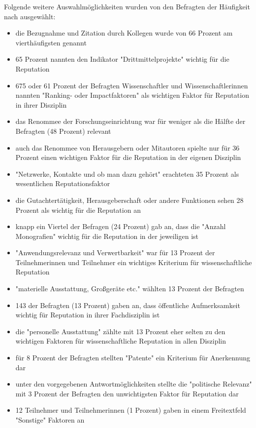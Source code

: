 Folgende weitere Auswahlmöglichkeiten wurden von den Befragten der Häufigkeit nach ausgewählt:
\begin{itemize}
\item die Bezugnahme und Zitation durch Kollegen wurde von 66 Prozent am vierthäufigsten genannt
\item 65 Prozent nannten den Indikator "Drittmittelprojekte" wichtig für die Reputation
\item 675 oder 61 Prozent der Befragten Wissenschaftler und Wissenschaftlerinnen nannten "Ranking- oder Impactfaktoren" als wichtigen Faktor für Reputation in ihrer Disziplin
\item das Renommee der Forschungseinrichtung war für weniger als die Hälfte der Befragten (48 Prozent) relevant
\item auch das Renommee von Herausgebern oder Mitautoren spielte nur für 36 Prozent einen wichtigen Faktor für die Reputation in der eigenen Disziplin
\item "Netzwerke, Kontakte und ob man dazu gehört" erachteten 35 Prozent als wesentlichen Reputationsfaktor
\item die Gutachtertätigkeit, Herausgeberschaft oder andere Funktionen sehen 28 Prozent als wichtig für die Reputation an
\item knapp ein Viertel der Befragen (24 Prozent) gab an, dass die "Anzahl Monografien" wichtig für die Reputation in der jeweiligen ist
\item "Anwendungsrelevanz und Verwertbarkeit" war für 13 Prozent der Teilnehmerinnen und Teilnehmer ein wichtiges Kriterium für wissenschaftliche Reputation
\item "materielle Ausstattung, Großgeräte etc." wählten 13 Prozent der Befragten
\item 143 der Befragten (13 Prozent) gaben an, dass öffentliche Aufmerksamkeit wichtig für Reputation in ihrer Fachdisziplin ist
\item die "personelle Ausstattung" zählte mit 13 Prozent eher selten zu den wichtigen Faktoren für wissenschaftliche Reputation in allen Disziplin
\item für 8 Prozent der Befragten stellten "Patente" ein Kriterium für Anerkennung dar
\item unter den vorgegebenen Antwortmöglichkeiten stellte die "politische Relevanz" mit 3 Prozent der Befragten den unwichtigsten Faktor für Reputation dar
\item 12 Teilnehmer und Teilnehmerinnen (1 Prozent) gaben in einem Freitextfeld "Sonstige" Faktoren an
\end{itemize}

